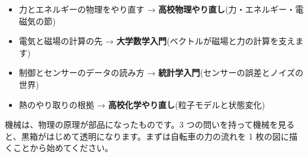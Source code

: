 \documentclass{article}
\begin{document}
\begin{itemize}
\item 力とエネルギーの物理をやり直す → \textbf{高校物理やり直し}(力・エネルギー・電磁気の節)
\item 電気と磁場の計算の先 → \textbf{大学数学入門}(ベクトルが磁場と力の計算を支えます)
\item 制御とセンサーのデータの読み方 → \textbf{統計学入門}(センサーの誤差とノイズの世界)
\item 熱のやり取りの根拠 → \textbf{高校化学やり直し}(粒子モデルと状態変化)
\end{itemize}

機械は、物理の原理が部品になったものです。3 つの問いを持って機械を見ると、黒箱がはじめて透明になります。まずは自転車の力の流れを 1 枚の図に描くことから始めてください。
\end{document}
